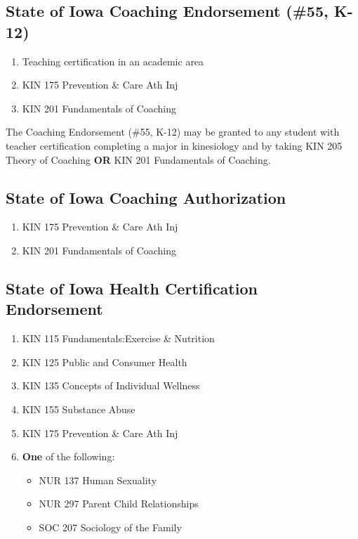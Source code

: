 \documentclass[
  letterpaper,
]{scrbook}
\providecommand{\tightlist}{%
  \setlength{\itemsep}{0pt}\setlength{\parskip}{0pt}}
\begin{document}
\subsection{State of Iowa Coaching Endorsement (\#55,
K-12)}\label{state-of-iowa-coaching-endorsement-55-k-12}

\begin{enumerate}
\def\labelenumi{\arabic{enumi}.}
\tightlist
\item
  Teaching certification in an academic area
\item
  KIN 175 Prevention \& Care Ath Inj
\item
  KIN 201 Fundamentals of Coaching
\end{enumerate}

The Coaching Endorsement (\#55, K-12) may be granted to any student with
teacher certification completing a major in kinesiology and by taking
KIN 205 Theory of Coaching \textbf{OR} KIN 201 Fundamentals of Coaching.

\subsection{State of Iowa Coaching
Authorization}\label{state-of-iowa-coaching-authorization}

\begin{enumerate}
\def\labelenumi{\arabic{enumi}.}
\tightlist
\item
  KIN 175 Prevention \& Care Ath Inj
\item
  KIN 201 Fundamentals of Coaching
\end{enumerate}

\subsection{State of Iowa Health Certification
Endorsement}\label{state-of-iowa-health-certification-endorsement}

\begin{enumerate}
\def\labelenumi{\arabic{enumi}.}
\tightlist
\item
  KIN 115 Fundamentals:Exercise \& Nutrition
\item
  KIN 125 Public and Consumer Health
\item
  KIN 135 Concepts of Individual Wellness
\item
  KIN 155 Substance Abuse
\item
  KIN 175 Prevention \& Care Ath Inj
\item
  \textbf{One} of the following:

  \begin{itemize}
  \tightlist
  \item
    NUR 137 Human Sexuality
  \item
    NUR 297 Parent Child Relationships
  \item
    SOC 207 Sociology of the Family
  \end{itemize}
\end{enumerate}
\end{document}
